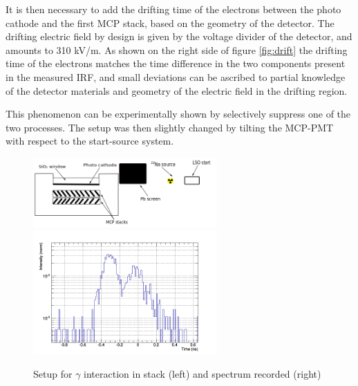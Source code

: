 It is then necessary to add the drifting time of the electrons between the photo cathode and the first MCP stack, based on the geometry of the detector. The drifting electric field by design is given by the voltage divider of the detector, and amounts to 310 kV/m.
As shown on the right side of figure \ref{fig:drift} the drifting time of the electrons matches the time difference in the two components present in the measured IRF, and small deviations can be ascribed to partial knowledge of the detector materials and geometry of the electric field in the drifting region.

This phenomenon can be experimentally shown by selectively suppress one of the two processes. The setup was then slightly changed by tilting the MCP-PMT with respect to the start-source system.
\begin{figure}[htbp]
\begin{center}
\includegraphics[width=7cm]{../Pictures/Chapter_8/screen_irf_2.png}
\includegraphics[width=7cm]{../Pictures/Chapter_8/turn_1.png}
\end{center}
\caption[Setup for $\gamma$ interaction in stack]{Setup for $\gamma$ interaction in stack (left) and spectrum recorded (right)}
\label{fig:twist2}
\end{figure}
